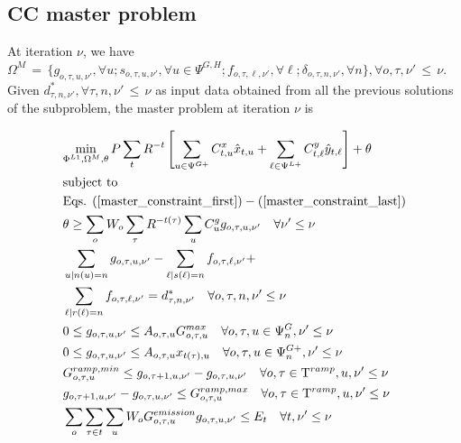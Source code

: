 \documentclass[final]{IEEEtran}
\newcommand{\myeq}{\,{=}\,}
\newcommand{\myleq}{\,{\leq}\,}
\newcommand{\Tau}{\mathrm{T}}
\begin{document}
\subsection{CC master problem}

At iteration $\nu$, we have \( \Omega^{M} \myeq \{ g_{o, \tau, u, \nu'}, \forall u; s_{o, \tau, u, \nu'}, \forall u \in \Psi^{G, H}; f_{o, \tau, \ell, \nu'}, \forall \ell; \delta_{o, \tau, n, \nu'}, \forall n \}, \forall o, \tau, \nu' \myleq \nu \). Given \( d_{\tau, n, \nu'}^*, \forall \tau, n, \nu' \myleq \nu \) as input data obtained from all the previous solutions of the subproblem, the master problem at iteration $\nu$ is

\begin{align}
&\label{cc_master_obj} \underset{\Phi^{L1}, \Omega^{M}, \theta}{\text{min}} \, P \sum\limits_{t} R^{-t} \left[ \sum\limits_{u \in \Psi^{G+}} C^x_{t, u} \hat{x}_{t, u} + \sum\limits_{\ell \in \Psi^{L+}} C^y_{t, \ell} \hat{y}_{t, \ell} \right] + \theta \\
&\text{subject to} \nonumber \\
&\text{Eqs. } (\ref{master_constraint_first}) - (\ref{master_constraint_last}) \\
&\label{cc_master_constraint1}\theta \geq \sum\limits_o W_o \sum\limits_{\tau} R^{-t(\tau)} \sum\limits_{u} C_{u}^g g_{o, \tau, u, \nu'} \quad \forall \nu' \leq \nu \\
&\sum\limits_{u | n(u) = n} g_{o, \tau, u, \nu'} - \sum\limits_{\ell | s(\ell) = n} f_{o, \tau, \ell, \nu'} + \nonumber \\
&\sum\limits_{\ell | r(\ell) = n} f_{o, \tau, \ell, \nu'} = d_{\tau, n, \nu'}^* \quad \forall o, \tau, n, \nu' \leq \nu \\
&0 \leq g_{o, \tau, u, \nu'} \leq A_{o, \tau, u} G_{o, \tau, u}^{max} \quad \forall o, \tau, u \in \Psi_n^G, \nu' \leq \nu \\
&0 \leq g_{o, \tau, u, \nu'} \leq A_{o, \tau, u} x_{t(\tau), u} \quad \forall o, \tau, u \in \Psi_n^{G+}, \nu' \leq \nu \\
&G^{ramp,min}_{o, \tau, u} \leq g_{o, \tau + 1, u, \nu'} - g_{o, \tau, u, \nu'} \quad \forall o, \tau \in \Tau^{ramp}, u, \nu' \leq \nu \\
&g_{o, \tau + 1, u, \nu'} - g_{o, \tau, u, \nu'} \leq G^{ramp,max}_{o, \tau, u} \quad \forall o, \tau \in \Tau^{ramp}, u, \nu' \leq \nu \\
&\label{cc_emission_ub}\sum\limits_{o} \sum\limits_{\tau \in t} \sum\limits_{u} W_o G^{emission}_{o, \tau, u} g_{o, \tau, u, \nu'}  \leq E_{t} \quad \forall t, \nu' \leq \nu \\

\end{align}
\end{document}
